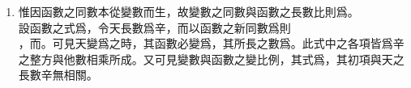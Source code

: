 \begin{enumerate} [label={第\chinese*款}]
	曾在第一百七十七款中證\raisebox{1pt} {\textcircled{\raisebox{-.5pt} {\small\textit{甲}}}}式之右邊爲由函數\CJKmove 而成。其戊之同數因爲\CJKmove，卽\uline{訥白爾}對數之根也。所以卯若愈大則\CJKmove 必愈與\CJKmove 相近，而其限爲\CJKmove。\\
	如令，則\CJKmove 之限爲戊，卽\CJKmove，故其函數爲常數。
	\item 惟因函數之同數本從變數而生，故變數之同數與函數之長數比則爲\CJKmove。\\
	設函數之式爲\CJKmove，令天長數爲辛，而以函數之新同數爲\CJKmove 則\\
	\CJKmove，而\CJKmove。可見天變爲\CJKmove 之時，其函數\CJKmove 必變爲\CJKmove，其所長之數爲\CJKmove。此式中之各項皆爲辛之整方與他數相乘所成。又可見變數與函數之變比例，其式爲\CJKmove，其初項\CJKmove 與天之長數辛無相關。\\

\end{enumerate}
